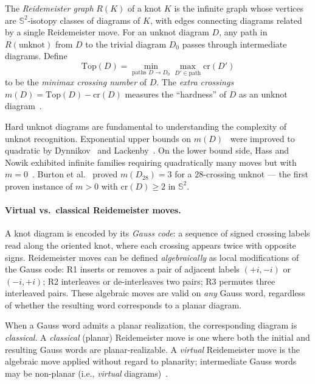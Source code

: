 \documentclass[a4paper,UKenglish,cleveref,autoref]{lipics-v2021}
\begin{document}
The \emph{Reidemeister graph} $R(K)$ of a knot $K$ is the infinite graph whose vertices are $\mathbb{S}^2$-isotopy classes of diagrams of $K$, with edges connecting diagrams related by a single Reidemeister move.
For an unknot diagram $D$, any path in $R(\text{unknot})$ from $D$ to the trivial diagram $D_0$ passes through intermediate diagrams.
Define
\[
\mathrm{Top}(D) = \min_{\text{paths } D \to D_0} \max_{D' \in \text{path}} \mathrm{cr}(D')
\]
to be the \emph{minimax crossing number} of $D$.
The \emph{extra crossings} $m(D) = \mathrm{Top}(D) - \mathrm{cr}(D)$ measures the ``hardness'' of $D$ as an unknot diagram~\cite{kauffman2012hard,Burton2020Hard}.

Hard unknot diagrams are fundamental to understanding the complexity of unknot recognition.
Exponential upper bounds on $m(D)$~\cite{Hass99Complexity} were improved to quadratic by Dynnikov~\cite{Dynnikov06ArcPresentation} and Lackenby~\cite{Lackenby15PolyBound}.
On the lower bound side, Hass and Nowik exhibited infinite families requiring quadratically many moves but with $m = 0$~\cite{Hass10QuadraticBound}.
Burton et al.~\cite{Burton2020Hard} proved $m(D_{28}) = 3$ for a $28$-crossing unknot --- the first proven instance of $m > 0$ with $\mathrm{cr}(D) \geq 2$ in $\mathbb{S}^2$.

\paragraph*{Virtual vs.\ classical Reidemeister moves.}
A knot diagram is encoded by its \emph{Gauss code}: a sequence of signed crossing labels read along the oriented knot, where each crossing appears twice with opposite signs.
Reidemeister moves can be defined \emph{algebraically} as local modifications of the Gauss code: R1 inserts or removes a pair of adjacent labels $(+i, -i)$ or $(-i, +i)$; R2 interleaves or de-interleaves two pairs; R3 permutes three interleaved pairs.
These algebraic moves are valid on \emph{any} Gauss word, regardless of whether the resulting word corresponds to a planar diagram.

When a Gauss word admits a planar realization, the corresponding diagram is \emph{classical}.
A \emph{classical} (planar) Reidemeister move is one where both the initial and resulting Gauss words are planar-realizable.
A \emph{virtual} Reidemeister move is the algebraic move applied without regard to planarity; intermediate Gauss words may be non-planar (i.e., \emph{virtual} diagrams)~\cite{Kauffman1999Virtual}.
\end{document}

